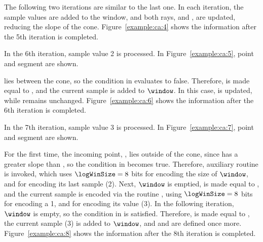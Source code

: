 

The following two iterations are similar to the last one. In each iteration, the sample values are added to the window, and both rays, \smin and \smax, are updated, reducing the slope of the cone. Figure~\ref{example:ca:4} shows the information after the 5th iteration is completed.



\clearpage


In the 6th iteration, sample value 2 is processed. In Figure~\ref{example:ca:5}, point  and segment  are shown.




 lies between the cone, so the condition in  evaluates to false. Therefore, \snapshot is made equal to , and the current sample is added to $\window$. In this case, \smin is updated, while \smax remains unchanged. Figure~\ref{example:ca:6} shows the information after the 6th iteration is completed.




\clearpage

In the 7th iteration, sample value 3 is processed. In Figure~\ref{example:ca:7}, point  and segment  are shown.




For the first time, the incoming point, , lies outside of the cone, since  has a greater slope than \smax, so the condition in  becomes true. Therefore, auxiliary routine \CAWinEnd is invoked, which uses $\logWinSize = 8$ bits for encoding the size of $\window$, and \tobitexp for encoding its last sample (2). Next, $\window$ is emptied, \archived is made equal to , and the current sample is encoded via the routine \CAWinStart, using $\logWinSize =8$ bits for encoding a 1, and \tobitexp for encoding its value (3). In the following iteration, $\window$ is empty, so the condition in  is satisfied. Therefore, \snapshot is made equal to , the current sample (3) is added to $\window$, and \smin and \smax are defined once more. Figure~\ref{example:ca:8} shows the information after the 8th iteration is completed.


